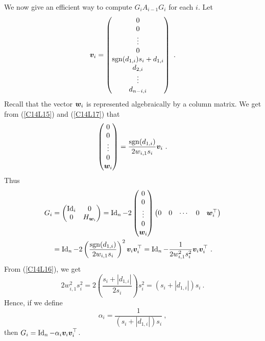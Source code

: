 We now give an efficient way to compute $G_i A_{i-1} G_i$ for each $i$.  Let
\begin{equation} \label{C14L19}
\bm{v}_i =
\begin{pmatrix}
0 \\ 0 \\ \vdots \\ 0 \\ \operatorname{sgn}(d_{1,i}) s_i + d_{1,i} \\
d_{2,i} \\ \vdots \\ d_{n-i,i}
\end{pmatrix} \ .
\end{equation}
Recall that the vector $\bm{w}_i$ is represented algebraically by a
 column matrix.  We get from (\ref{C14L15}) and
(\ref{C14L17}) that
\[
\begin{pmatrix}
0 \\ 0 \\ \vdots \\ 0 \\ \VEC{w}_i
\end{pmatrix} = \frac{\sgn(d_{1,i})}{2 w_{i,1} s_i} \VEC{v}_i \ .
\]
Thus
\begin{align*}
G_i &=
\begin{pmatrix}
\operatorname{Id}_{i} & 0 \\
0 & H_{\bm{w}_i}
\end{pmatrix}
= \operatorname{Id}_n - 2 \begin{pmatrix}
0 \\ 0 \\ \vdots \\ 0 \\ \bm{w}_i
\end{pmatrix} \begin{pmatrix}
0 & 0 & \cdots & 0 & \bm{w}_i^\top
\end{pmatrix} \\
&= \operatorname{Id}_n - 2 \left(\frac{\operatorname{sgn}(d_{1,i})}{2 w_{i,1} s_i}\right)^2 \bm{v}_i
\bm{v}_i^\top
= \operatorname{Id}_n - \frac{1}{2 w_{i,1}^2 s_i^2} \bm{v}_i \bm{v}_i^\top \  .
\end{align*}
From (\ref{C14L16}), we get
\[
2 w_{i,1}^2 s_i^2 = 2 \left(\frac{s_i + \left|d_{1,i}\right|}{2s_i}\right)
s_i^2 = \left( s_i + \left| d_{1,i}\right| \right)s_i \ .
\]
Hence, if we define
\begin{equation} \label{C14L20}
\alpha_i = \frac{1}{\left( s_i + \left| d_{1,i}\right| \right)s_i} \  ,
\end{equation}
then $\displaystyle G_i = \operatorname{Id}_n - \alpha_i \bm{v}_i \bm{v}_i^\top$.
